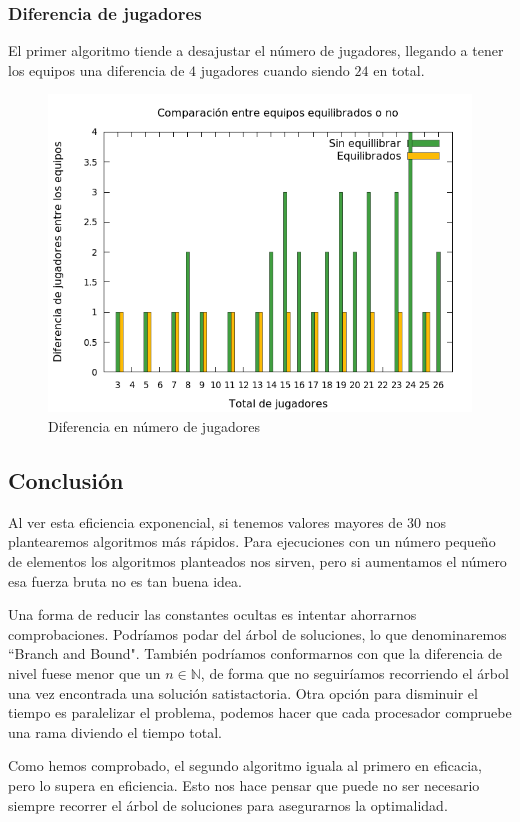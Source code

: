 \subsubsection{Diferencia de jugadores}
El primer algoritmo tiende a desajustar el número de jugadores, llegando a tener los equipos una diferencia de $4$ jugadores cuando siendo $24$ en total.

\begin{figure}[H]
    \centering
    \includegraphics[scale=0.5]{../Equipos/Graficas/separacion.png}
    \caption{Diferencia en número de jugadores}
    \label{fig:separacion}
\end{figure}

\subsection{Conclusión}
Al ver esta eficiencia exponencial, si tenemos valores mayores de $30$ nos plantearemos algoritmos más rápidos. 
Para ejecuciones con un número pequeño de elementos los algoritmos planteados nos sirven, pero si aumentamos el número esa fuerza bruta no es tan buena idea.

Una forma de reducir las constantes ocultas es intentar ahorrarnos comprobaciones. 
Podríamos podar del árbol de soluciones, lo que denominaremos ``Branch and Bound".
También podríamos conformarnos con que la diferencia de nivel fuese menor que un $n\in\mathbb{N}$, de forma que no seguiríamos recorriendo el árbol una vez encontrada una solución satistactoria. 
Otra opción para disminuir el tiempo es paralelizar el problema, podemos hacer que cada procesador compruebe una rama diviendo el tiempo total.

Como hemos comprobado, el segundo algoritmo iguala al primero en eficacia, pero lo supera en eficiencia. 
Esto nos hace pensar que puede no ser necesario siempre recorrer el árbol de soluciones para asegurarnos la optimalidad.
